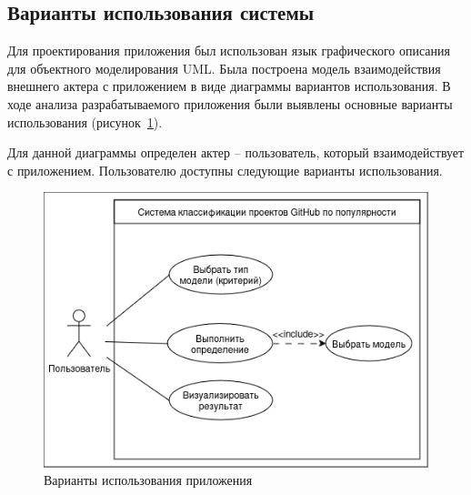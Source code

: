 \subsection{Варианты использования системы}
\label{sec:Using}

Для проектирования приложения был использован язык графического описания для объектного моделирования UML. Была построена модель взаимодействия внешнего актера с приложением в виде диаграммы вариантов использования. В ходе анализа разрабатываемого приложения были выявлены основные варианты использования (рисунок~\ref{ris:variants}).

Для данной диаграммы определен актер -- пользователь, который взаимодействует с приложением. Пользователю доступны следующие варианты использования.

\begin{figure}[h]
    \centering
    \includegraphics[width=1\linewidth]{pic/variants.png}
    \vspace{-1em}\caption{Варианты использования приложения}
    \label{ris:variants}
\end{figure}
\vspace{1em}

